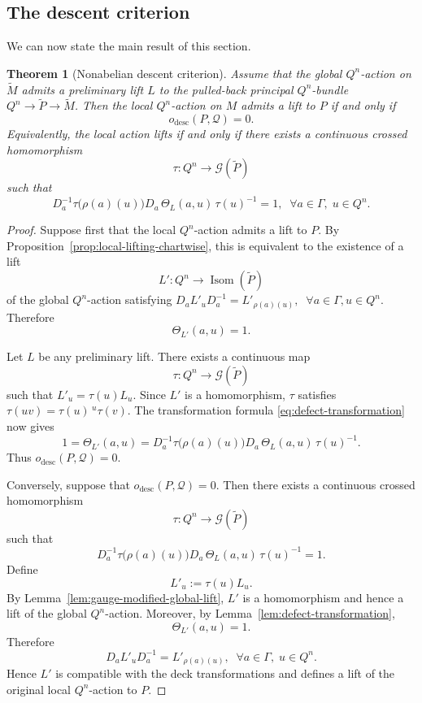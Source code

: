 \documentclass[11pt,a4paper]{article}
\numberwithin{equation}{section}
\newtheorem{thm}[definition]{Theorem}
\theoremstyle{named}
\begin{document}
\subsection{The descent criterion}

We can now state the main result of this section.

\begin{thm}[Nonabelian descent criterion]
\label{thm:nonabelian-descent}
Assume that the global \(Q^n\)-action on \(\widetilde M\) admits a preliminary lift $L$ to the pulled-back principal \(Q^n\)-bundle $Q^n\longrightarrow\widetilde P\longrightarrow\widetilde M$.
Then the local \(Q^n\)-action on \(M\) admits a lift to \(P\) if and only if
\[
o_{\mathrm{desc}}(P,\mathcal Q)=0.
\]
Equivalently, the local action lifts if and only if there exists a continuous
crossed homomorphism
\[
\tau:Q^n\longrightarrow\mathcal G(\widetilde P)
\]
such that
\[
D_a^{-1}\tau\bigl(\rho(a)(u)\bigr)D_a\, \Theta_L(a,u)\, \tau(u)^{-1} = 1,\;\;\forall a\in\Gamma,\;u\in Q^n.
\]

\end{thm}



\begin{proof}
Suppose first that the local \(Q^n\)-action admits a lift to \(P\). By Proposition~\ref{prop:local-lifting-chartwise}, this is equivalent to the existence of a lift
\[
L':Q^n\longrightarrow\operatorname{Isom}(\widetilde P)
\]
of the global \(Q^n\)-action satisfying $D_aL'_uD_a^{-1}
=
L'_{\rho(a)(u)},\;\;\forall a\in\Gamma,u\in Q^n$. Therefore
\[
\Theta_{L'}(a,u)=1.
\]

Let \(L\) be any preliminary lift. There exists a continuous map
\[
\tau:Q^n\longrightarrow\mathcal G(\widetilde P)
\]
such that $L'_u=\tau(u)L_u$.
Since \(L'\) is a homomorphism, \(\tau\) satisfies $\tau(uv)=\tau(u)\,{}^u\tau(v)$.
The transformation formula \eqref{eq:defect-transformation} now gives
\[
1
=
\Theta_{L'}(a,u)
=
D_a^{-1}\tau\bigl(\rho(a)(u)\bigr)D_a\,
\Theta_L(a,u)\,
\tau(u)^{-1}.
\]
Thus $o_{\mathrm{desc}}(P,\mathcal Q)=0$.

Conversely, suppose that $o_{\mathrm{desc}}(P,\mathcal Q)=0$.
Then there exists a continuous crossed homomorphism
\[
\tau:Q^n\longrightarrow\mathcal G(\widetilde P)
\]
such that
\[
D_a^{-1}\tau\bigl(\rho(a)(u)\bigr)D_a\,
\Theta_L(a,u)\,
\tau(u)^{-1}
=
1.
\]
Define
\[
L'_u:=\tau(u)L_u.
\]
By Lemma~\ref{lem:gauge-modified-global-lift}, \(L'\) is a homomorphism and hence a lift of the global \(Q^n\)-action. Moreover, by Lemma~\ref{lem:defect-transformation},
\[
\Theta_{L'}(a,u)=1.
\]
Therefore
\[
D_aL'_uD_a^{-1}
=
L'_{\rho(a)(u)},\;\;\forall a\in\Gamma,\;u\in Q^n.\]
Hence \(L'\) is compatible with the deck transformations and defines a lift of the original local \(Q^n\)-action to \(P\).
\end{proof}
\end{document}
